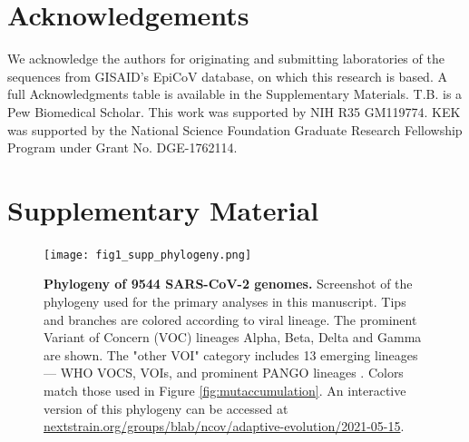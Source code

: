 \documentclass[11pt,oneside,letterpaper]{article}
\newcommand{\beginsupplement}{%
	\setcounter{figure}{0}
	\renewcommand{\thefigure}{S\arabic{figure}}%
}
\begin{document}
\section*{Acknowledgements}
\fussy
We acknowledge the authors for originating and submitting laboratories of the sequences from GISAID's EpiCoV database, on which this research is based.
A full Acknowledgments table is available in the Supplementary Materials.
T.B. is a Pew Biomedical Scholar.
This work was supported by NIH R35 GM119774.
KEK was supported by the National Science Foundation Graduate Research Fellowship Program under Grant No. DGE-1762114.

\small


\normalsize
\clearpage

\section*{Supplementary Material}
\beginsupplement

\begin{figure}[h!]
\centerline{\texttt{[image: fig1\_supp\_phylogeny.png]}}
\caption{\textbf{Phylogeny of 9544 SARS-CoV-2 genomes.}
Screenshot of the phylogeny used for the primary analyses in this manuscript. Tips and branches are colored according to viral lineage. The prominent Variant of Concern (VOC) lineages Alpha, Beta, Delta and Gamma are shown. The "other VOI" category includes 13 emerging lineages --- WHO VOCS, VOIs, and prominent PANGO lineages \cite{Rambaut2020-dy}. Colors match those used in Figure \ref{fig:mutaccumulation}. An interactive version of this phylogeny can be accessed at \href{https://nextstrain.org/groups/blab/ncov/adaptive-evolution/2021-05-15}{nextstrain.org/groups/blab/ncov/adaptive-evolution/2021-05-15}.
}
\label{fig:phylogeny}
\end{figure}
\end{document}
